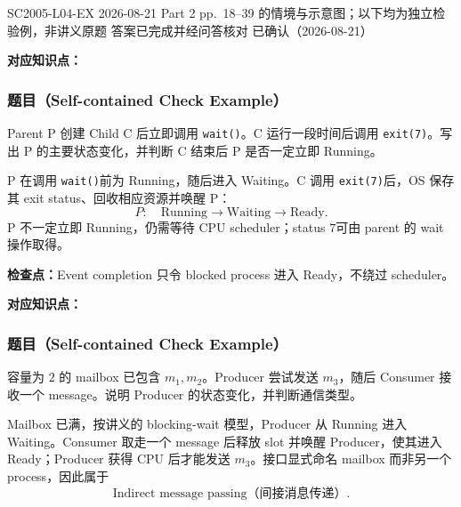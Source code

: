 

\examplemeta
  {SC2005-L04-EX}
  {2026-08-21}
  {Part 2 pp.~18--39 的情境与示意图；以下均为独立检验例，非讲义原题}
  {答案已完成并经问答核对}
  {已确认（2026-08-21）}


\textbf{对应知识点：}

\subsubsection*{题目（Self-contained Check Example）}

Parent P 创建 Child C 后立即调用 \texttt{wait()}。C 运行一段时间后调用 \texttt{exit(7)}。写出 P 的主要状态变化，并判断 C 结束后 P 是否一定立即 Running。

\begin{checkedsolution}
P 在调用 \texttt{wait()}前为 Running，随后进入 Waiting。C 调用 \texttt{exit(7)}后，OS 保存其 exit status、回收相应资源并唤醒 P：
\[
  P:\quad \text{Running}\rightarrow\text{Waiting}\rightarrow\text{Ready}.
\]
P 不一定立即 Running，仍需等待 CPU scheduler；status $7$可由 parent 的 wait 操作取得。
\end{checkedsolution}

\textbf{检查点：}Event completion 只令 blocked process 进入 Ready，不绕过 scheduler。


\textbf{对应知识点：}

\subsubsection*{题目（Self-contained Check Example）}

容量为 $2$ 的 mailbox 已包含 $m_1,m_2$。Producer 尝试发送 $m_3$，随后 Consumer 接收一个 message。说明 Producer 的状态变化，并判断通信类型。

\begin{checkedsolution}
Mailbox 已满，按讲义的 blocking-wait 模型，Producer 从 Running 进入 Waiting。Consumer 取走一个 message 后释放 slot 并唤醒 Producer，使其进入 Ready；Producer 获得 CPU 后才能发送 $m_3$。接口显式命名 mailbox 而非另一个 process，因此属于
\[
  \boxed{\text{Indirect message passing（间接消息传递）}}.
\]
\end{checkedsolution}

